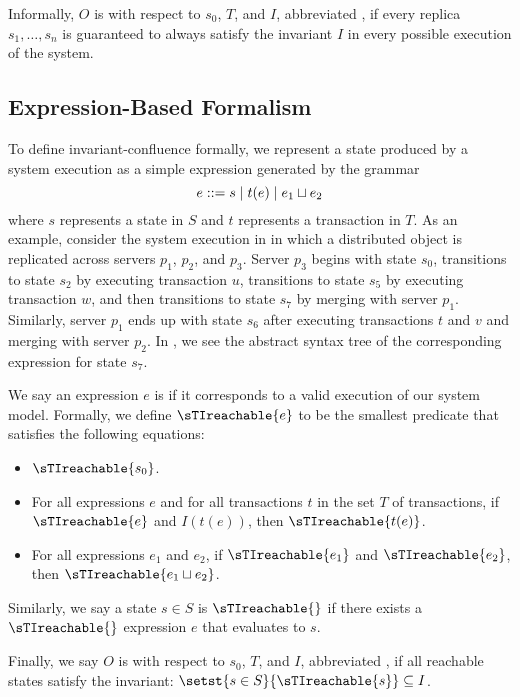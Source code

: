 Informally, $O$ is  with respect to $s_0$, $T$, and
$I$, abbreviated , if every replica $s_1, \ldots, s_n$
is guaranteed to always satisfy the invariant $I$ in every possible execution
of the system.

\subsection{Expression-Based Formalism}
To define invariant-confluence formally, we represent a state produced by a
system execution as a simple expression generated by the grammar
\[
  e ::= s \mid t(e) \mid e_1 \sqcup e_2
\]
where $s$ represents a state in $S$ and $t$ represents a transaction in $T$. As
an example, consider the system execution in  in which
a distributed object is replicated across servers $p_1$, $p_2$, and $p_3$.
Server $p_3$ begins with state $s_0$, transitions to state $s_2$ by executing
transaction $u$, transitions to state $s_5$ by executing transaction $w$, and
then transitions to state $s_7$ by merging with server $p_1$. Similarly, server
$p_1$ ends up with state $s_6$ after executing transactions $t$ and $v$ and
merging with server $p_2$. In , we see the abstract syntax
tree of the corresponding expression for state $s_7$.

{}

We say an expression $e$ is  if it corresponds to a
valid execution of our system model. Formally, we define $\sTIreachable{e}$ to
be the smallest predicate that satisfies the following equations:
\begin{itemize}
  \item
    $\sTIreachable{s_0}$.
  \item
    For all expressions $e$ and for all transactions $t$ in the set $T$ of
    transactions, if $\sTIreachable{e}$ and $I(t(e))$, then
    $\sTIreachable{t(e)}$.
  \item
    For all expressions $e_1$ and $e_2$, if $\sTIreachable{e_1}$ and
    $\sTIreachable{e_2}$, then $\sTIreachable{e_1 \join e_2}$.
\end{itemize}
Similarly, we say a state $s \in S$ is $\sTIreachable{}$ if there exists a
$\sTIreachable{}$ expression $e$ that evaluates to $s$.

Finally, we say $O$ is  with respect to $s_0$,
$T$, and $I$, abbreviated , if all reachable states
satisfy the invariant: $\setst{s \in S}{\sTIreachable{s}} \subseteq I$.



